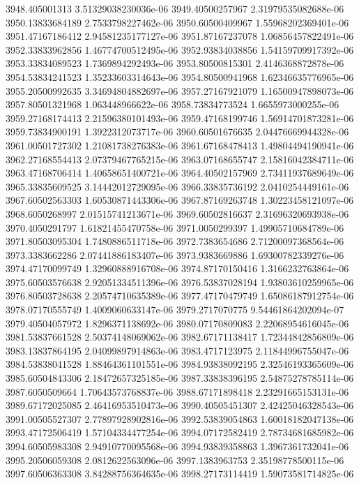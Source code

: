 {3948.405001313 3.51329038230036e-06
3949.40500257967 2.31979535082688e-06
3950.13833684189 2.7533798227462e-06
3950.60500409967 1.55968202369401e-06
3951.47167186412 2.94581235177127e-06
3951.87167237078 1.06856457822491e-06
3952.33833962856 1.46774700512495e-06
3952.93834038856 1.54159709917392e-06
3953.33834089523 1.7369894292493e-06
3953.80500815301 2.4146368872878e-06
3954.53834241523 1.35233603314643e-06
3954.80500941968 1.62346635776965e-06
3955.20500992635 3.34694804882697e-06
3957.27167921079 1.16500947898073e-06
3957.80501321968 1.063448966622e-06
3958.73834773524 1.6655973000255e-06
3959.27168174413 2.21596380101493e-06
3959.47168199746 1.56914701873281e-06
3959.73834900191 1.3922312073717e-06
3960.60501676635 2.04476669944328e-06
3961.00501727302 1.21081738276383e-06
3961.67168478413 1.49804494190941e-06
3962.27168554413 2.07379467765215e-06
3963.07168655747 2.15816042384711e-06
3963.47168706414 1.40658651400721e-06
3964.40502157969 2.73411937689649e-06
3965.33835609525 3.14442012729095e-06
3966.33835736192 2.0410254449161e-06
3967.60502563303 1.60530871443306e-06
3967.87169263748 1.30223458121097e-06
3968.6050268997 2.01515741213671e-06
3969.60502816637 2.31696320693938e-06
3970.4050291797 1.61821455470758e-06
3971.0050299397 1.49905710684789e-06
3971.80503095304 1.7480886511718e-06
3972.7383654686 2.71200097368564e-06
3973.3383662286 2.07441886183407e-06
3973.9383669886 1.69300782339276e-06
3974.47170099749 1.32960888916708e-06
3974.87170150416 1.3166232763864e-06
3975.60503576638 2.92051334511396e-06
3976.53837028194 1.93803610259965e-06
3976.80503728638 2.20574710635389e-06
3977.47170479749 1.65086187912754e-06
3978.07170555749 1.4009060633147e-06
3979.2717070775 9.54461864202094e-07
3979.40504057972 1.8296371138692e-06
3980.07170809083 2.22068954616045e-06
3981.53837661528 2.50374148069062e-06
3982.67171138417 1.72344842856809e-06
3983.13837864195 2.04099897914863e-06
3983.4717123975 2.11844996755047e-06
3984.53838041528 1.88464361101551e-06
3984.93838092195 2.32546193365609e-06
3985.60504843306 2.18472657325185e-06
3987.33838396195 2.54875278785114e-06
3987.6050509664 1.70643573768837e-06
3988.67171898418 2.23291665153131e-06
3989.67172025085 2.46416953510473e-06
3990.40505451307 2.42425046328543e-06
3991.00505527307 2.77897928902816e-06
3992.53839054863 1.60018182047138e-06
3993.47172506419 1.57104334477254e-06
3994.07172582419 2.78734681685982e-06
3994.60505983308 2.94910770095568e-06
3994.93839358863 1.3967361732041e-06
3995.20506059308 2.0812622563096e-06
3997.1383963753 2.35198778500115e-06
3997.60506363308 3.84288756364635e-06
3998.27173114419 1.59073581714825e-06
}
